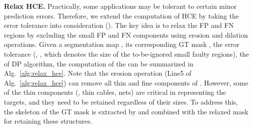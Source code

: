 \documentclass[10pt,twocolumn,letterpaper]{article}
\begin{document}
\noindent\textbf{Relax HCE.} 
Practically, some applications may be tolerant to certain minor prediction errors. Therefore, we extend the computation of HCE by taking the error tolerance  into consideration (). The key idea is to relax the FP and FN regions by excluding the small FP and FN components using erosion \cite{haralick1987image} and dilation \cite{haralick1987image} operations. Given a segmentation map , its corresponding GT mask , the error tolerance (\eg, , which denotes the size of the to-be-ignored small faulty regions), the  of DP algorithm, the computation of the  can be summarized in Alg.~\ref{alg:relax_hce}. Note that the erosion operation (Line5 of Alg.~\ref{alg:relax_hce}) can remove all thin and fine components of . 
However, some of the thin components (\eg, thin cables, nets) are critical in representing the targets, and they need to be retained regardless of their sizes.  
To address this, the skeleton of the GT mask is extracted by \cite{DBLP:journals/cacm/ZhangS84} and combined with the relaxed  mask for retaining these structures. 
\end{document}

